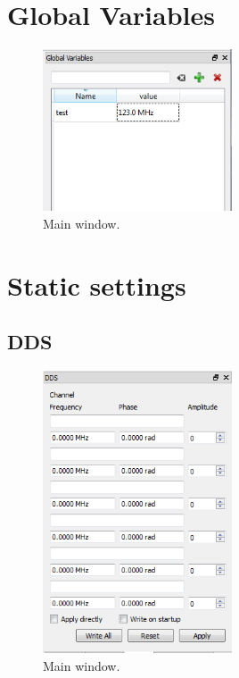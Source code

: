\documentclass{scrartcl}
\begin{document}
\section{Global Variables}
\begin{figure}[htbp]
\begin{center}
\includegraphics[width=0.5\textwidth]{GlobalVariables}
\end{center}
\caption{\label{GlobalVariables} Main window.}
\end{figure}


\section{Static settings}
\subsection{DDS}
\begin{figure}[htbp]
\begin{center}
\includegraphics[width=0.5\textwidth]{DDS}
\end{center}
\caption{\label{DDS} Main window.}
\end{figure}
\end{document}
